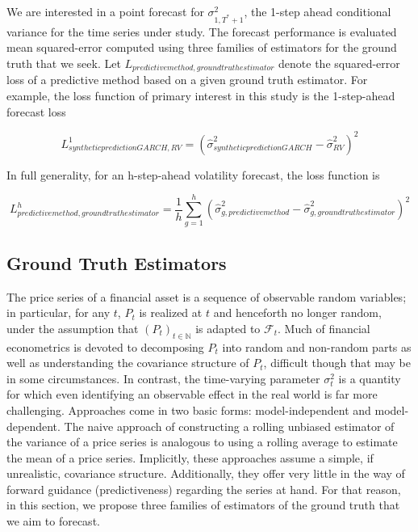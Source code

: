 \documentclass[11pt]{article}
\def\mc#1{\mathcal{#1}} %
\def\mc#1{\mathcal{#1}}
\theoremstyle{definition}
\begin{document}
We are interested in a point forecast for $\sigma^{2}_{1,T^{*}+1}$, the 1-step ahead conditional variance for the time series under study.  The forecast performance is evaluated mean squared-error computed using three families of estimators for the ground truth that we seek.  Let $L_{predictive method, ground truth estimator} $ denote the squared-error loss of a predictive method based on a given ground truth estimator.  For example, the loss function of primary interest in this study is the 1-step-ahead forecast loss

$$ L^{1}_{synthetic prediction GARCH, RV} = (\hat\sigma^{2}_{synthetic prediction GARCH} - \hat\sigma^{2}_{RV})^{2}$$

In full generality, for an h-step-ahead volatility forecast, the loss function is 

$$ L^{h}_{predictive method, ground truth estimator} = \frac{1}{h}\sum_{g=1}^{h}(\hat\sigma^{2}_{g, predictive method} - \hat\sigma^{2}_{g, ground truth estimator})^{2}$$



\subsection{Ground Truth Estimators}
\label{Ground Truth Estimators}

The price series of a financial asset is a sequence of observable random variables; in particular, for any $t$, $P_{t}$ is realized at $t$ and henceforth no longer random, under the assumption that $(P_{t})_{t\in\mathbb{N}}$ is adapted to $\mc{F}_{t}$.  Much of financial econometrics is devoted to decomposing $P_{t}$ into random and non-random parts as well as understanding the covariance structure of $P_{t}$, difficult though that may be in some circumstances.  In contrast, the time-varying parameter $\sigma^{2}_{t}$ is a quantity for which even identifying an observable effect in the real world is far more challenging.  Approaches come in two basic forms: model-independent and model-dependent.  The naive approach of constructing a rolling unbiased estimator of the variance of a price series is analogous to using a rolling average to estimate the mean of a price series.  Implicitly, these approaches assume a simple, if unrealistic, covariance structure.  Additionally, they offer very little in the way of forward guidance (predictiveness) regarding the series at hand.  For that reason, in this section, we propose three families of estimators of the ground truth that we aim to forecast.
\end{document}
